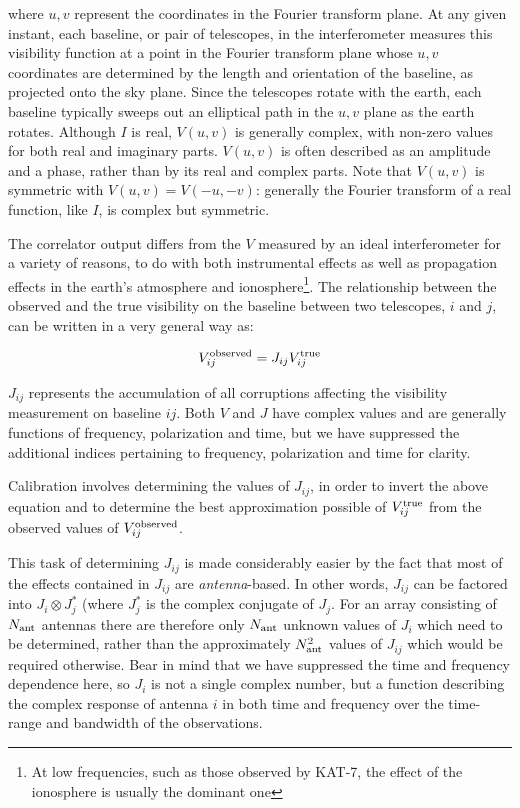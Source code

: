 \documentclass[force,almostfull,justified]{tufte-book}
\begin{document}
where $u, v$ represent the coordinates in the Fourier transform plane.  At any given instant, each
baseline, or pair of telescopes, in the interferometer measures this visibility function at a point in
the Fourier transform plane whose $u, v$ coordinates are determined by the length and orientation of
the baseline, as projected onto the sky plane.  Since the telescopes rotate with the earth, each
baseline typically sweeps out an elliptical path in the $u, v$ plane as the earth rotates.  Although
$I$ is real, $V(u,v)$ is generally complex, with non-zero values for both real and imaginary parts.
$V(u,v)$ is often described as an amplitude and a phase, rather than by its real and complex parts.
Note that $V(u,v)$ is symmetric with $V(u,v) = V(-u,-v)$: generally the Fourier transform of a real
function, like $I$, is complex but symmetric.

The correlator output differs from the $V$ measured by an ideal interferometer for a variety of
reasons, to do with both instrumental effects as well as propagation effects in the earth's atmosphere
and ionosphere\footnote{At low frequencies, such as those observed by KAT-7, the effect of the
ionosphere is usually the dominant one}. The relationship between the observed and the true visibility
on the baseline between two telescopes, $i$ and $j$, can be written in a very general way as:

\begin{equation}
V_{ij}^{\rm observed}=J_{ij}V_{ij}^{\rm true}
\end{equation}

$J_{ij}$ represents the accumulation of all corruptions affecting the visibility measurement on
baseline $ij$.  Both $V$ and $J$ have complex values and are generally functions of frequency,
polarization and time, but we have suppressed the additional indices pertaining to frequency,
polarization and time for clarity.

Calibration involves determining the values of $J_{ij}$, in order to invert the above equation and to
determine the best approximation possible of $V_{ij}^{\rm true}$ from the observed values of
$V_{ij}^{\rm observed}$.

This task of determining $J_{ij}$ is made considerably easier by the fact that most of the effects
contained in $J_{ij}$ are {\em antenna}-based.  In other words, $J_{ij}$ can be factored into $J_i
\otimes J_j^*$ (where $J_j^*$ is the complex conjugate of $J_j$.  For an array consisting of $N_{\rm
ant}$ antennas there are therefore only $N_{\rm ant}$ unknown values of $J_i$ which need to be
determined, rather than the approximately $N_{\rm ant}^2$ values of $J_{ij}$ which would be required
otherwise.  Bear in mind that we have suppressed the time and frequency dependence here, so $J_i$ is
not a single complex number, but a function describing the complex response of antenna $i$ in both
time and frequency over the time-range and bandwidth of the observations.
\end{document}
